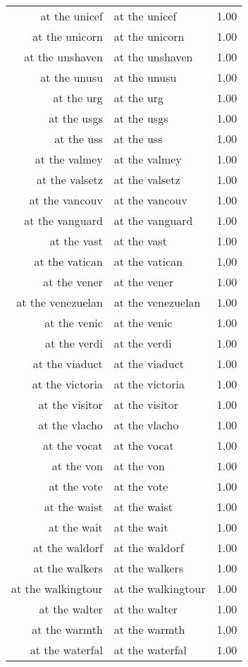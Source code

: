 \begin{table}[ht]
\begin{tabular}{rlr}
  at the unicef & at the unicef & 1.00 \\ 
  at the unicorn & at the unicorn & 1.00 \\ 
  at the unshaven & at the unshaven & 1.00 \\ 
  at the unusu & at the unusu & 1.00 \\ 
  at the urg & at the urg & 1.00 \\ 
  at the usgs & at the usgs & 1.00 \\ 
  at the uss & at the uss & 1.00 \\ 
  at the valmey & at the valmey & 1.00 \\ 
  at the valsetz & at the valsetz & 1.00 \\ 
  at the vancouv & at the vancouv & 1.00 \\ 
  at the vanguard & at the vanguard & 1.00 \\ 
  at the vast & at the vast & 1.00 \\ 
  at the vatican & at the vatican & 1.00 \\ 
  at the vener & at the vener & 1.00 \\ 
  at the venezuelan & at the venezuelan & 1.00 \\ 
  at the venic & at the venic & 1.00 \\ 
  at the verdi & at the verdi & 1.00 \\ 
  at the viaduct & at the viaduct & 1.00 \\ 
  at the victoria & at the victoria & 1.00 \\ 
  at the visitor & at the visitor & 1.00 \\ 
  at the vlacho & at the vlacho & 1.00 \\ 
  at the vocat & at the vocat & 1.00 \\ 
  at the von & at the von & 1.00 \\ 
  at the vote & at the vote & 1.00 \\ 
  at the waist & at the waist & 1.00 \\ 
  at the wait & at the wait & 1.00 \\ 
  at the waldorf & at the waldorf & 1.00 \\ 
  at the walkers & at the walkers & 1.00 \\ 
  at the walkingtour & at the walkingtour & 1.00 \\ 
  at the walter & at the walter & 1.00 \\ 
  at the warmth & at the warmth & 1.00 \\ 
  at the waterfal & at the waterfal & 1.00 \\ 

\end{tabular}
\end{table}
